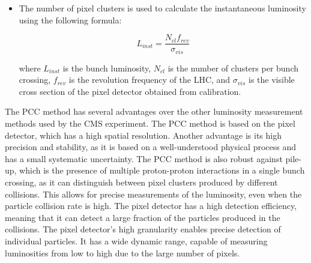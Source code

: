 \begin{itemize}
\item The number of pixel clusters is used to calculate the instantaneous luminosity using the following formula:

\begin{equation}
 L_{inst} = \frac{N_{cl} f_{rev} } {\sigma_{vis}}   
\end{equation}

where $L_{inst}$ is the bunch luminosity, $N_{cl}$ is the number of clusters per bunch crossing, $f_{rev}$ is the revolution frequency of the LHC, and $\sigma_{vis}$ is the visible cross section of the pixel detector obtained from calibration.

\end{itemize}

The PCC method has several advantages over the other luminosity measurement methods used by the CMS experiment. The PCC method is based on the pixel detector, which has a high spatial resolution. Another advantage is its high precision and stability, as it is based on a well-understood physical process and has a small systematic uncertainty. %
The PCC method is also robust against pile-up, which is the presence of multiple proton-proton interactions in a single bunch crossing, as it can distinguish between pixel clusters produced by different collisions. %
This allows for precise measurements of the luminosity, even when the particle collision rate is high. The pixel detector has a high detection efficiency, meaning that it can detect a large fraction of the particles produced in the collisions. The pixel detector's high granularity enables precise detection of individual particles. %
It has a wide dynamic range, capable of measuring luminosities from low to high due to the large number of pixels.


